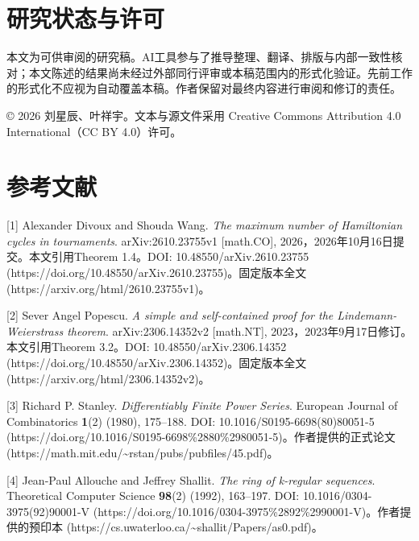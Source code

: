 \documentclass[12pt,a4paper]{article}
\begin{document}
\section*{研究状态与许可}
本文为可供审阅的研究稿。AI工具参与了推导整理、翻译、排版与内部一致性核对；本文陈述的结果尚未经过外部同行评审或本稿范围内的形式化验证。先前工作的形式化不应视为自动覆盖本稿。作者保留对最终内容进行审阅和修订的责任。

© 2026 刘星辰、叶祥宇。文本与源文件采用 Creative Commons Attribution 4.0 International（CC BY 4.0）许可。

\section*{参考文献}
[1] Alexander Divoux and Shouda Wang. \emph{The maximum number of Hamiltonian cycles in tournaments}. arXiv:2610.23755v1 [math.CO], 2026，2026年10月16日提交。本文引用Theorem 1.4。DOI: 10.48550/arXiv.2610.23755 (https://doi.org/10.48550/arXiv.2610.23755)。固定版本全文 (https://arxiv.org/html/2610.23755v1)。

[2] Sever Angel Popescu. \emph{A simple and self-contained proof for the Lindemann-Weierstrass theorem}. arXiv:2306.14352v2 [math.NT], 2023，2023年9月17日修订。本文引用Theorem 3.2。DOI: 10.48550/arXiv.2306.14352 (https://doi.org/10.48550/arXiv.2306.14352)。固定版本全文 (https://arxiv.org/html/2306.14352v2)。

[3] Richard P. Stanley. \emph{Differentiably Finite Power Series}. European Journal of Combinatorics \textbf{1}(2) (1980), 175–188. DOI: 10.1016/S0195-6698(80)80051-5 (https://doi.org/10.1016/S0195-6698\%2880\%2980051-5)。作者提供的正式论文 (https://math.mit.edu/\textasciitilde{}rstan/pubs/pubfiles/45.pdf)。

[4] Jean-Paul Allouche and Jeffrey Shallit. \emph{The ring of k-regular sequences}. Theoretical Computer Science \textbf{98}(2) (1992), 163–197. DOI: 10.1016/0304-3975(92)90001-V (https://doi.org/10.1016/0304-3975\%2892\%2990001-V)。作者提供的预印本 (https://cs.uwaterloo.ca/\textasciitilde{}shallit/Papers/as0.pdf)。
\end{document}
